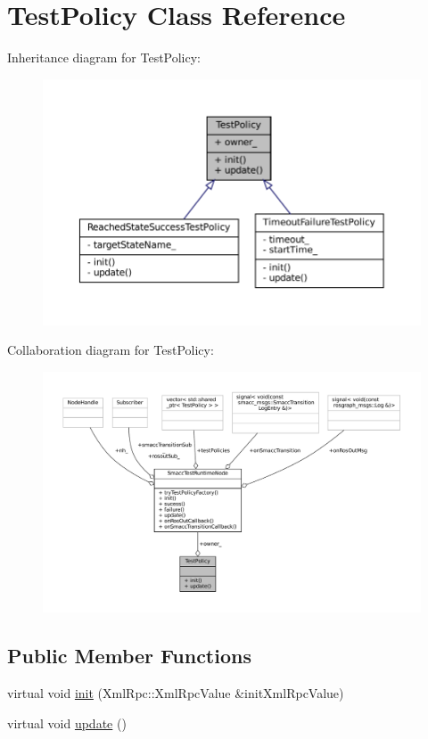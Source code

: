 \hypertarget{classTestPolicy}{}\section{Test\+Policy Class Reference}
\label{classTestPolicy}


Inheritance diagram for Test\+Policy\+:
\nopagebreak
\begin{figure}[H]
\begin{center}
\leavevmode
\includegraphics[width=350pt]{classTestPolicy__inherit__graph}
\end{center}
\end{figure}


Collaboration diagram for Test\+Policy\+:
\nopagebreak
\begin{figure}[H]
\begin{center}
\leavevmode
\includegraphics[width=350pt]{classTestPolicy__coll__graph}
\end{center}
\end{figure}
\subsection*{Public Member Functions}
\begin{DoxyCompactItemize}
\item 
virtual void \hyperlink{classTestPolicy_a43d28339f108860503ef66ce4692596d}{init} (Xml\+Rpc\+::\+Xml\+Rpc\+Value \&init\+Xml\+Rpc\+Value)
\item 
virtual void \hyperlink{classTestPolicy_ae7a8f2ef3c4d513122ad20d5cffc88db}{update} ()
\end{DoxyCompactItemize}
